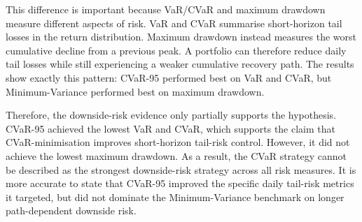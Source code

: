 \par This difference is important because VaR/CVaR and maximum drawdown measure different aspects of risk. VaR and CVaR summarise short-horizon tail losses in the return distribution. Maximum drawdown instead measures the worst cumulative decline from a previous peak. A portfolio can therefore reduce daily tail losses while still experiencing a weaker cumulative recovery path. The results show exactly this pattern: CVaR-95 performed best on VaR and CVaR, but Minimum-Variance performed best on maximum drawdown.
\par Therefore, the downside-risk evidence only partially supports the hypothesis. CVaR-95 achieved the lowest VaR and CVaR, which supports the claim that CVaR-minimisation improves short-horizon tail-risk control. However, it did not achieve the lowest maximum drawdown. As a result, the CVaR strategy cannot be described as the strongest downside-risk strategy across all risk measures. It is more accurate to state that CVaR-95 improved the specific daily tail-risk metrics it targeted, but did not dominate the Minimum-Variance benchmark on longer path-dependent downside risk.

